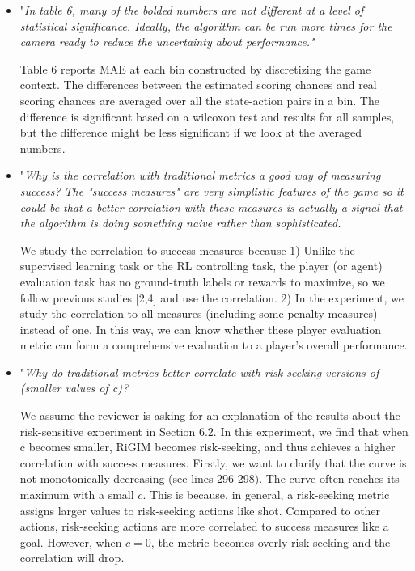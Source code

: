 \documentclass{article}
\begin{document}
\begin{itemize}
    \item "{\it In table 6, many of the bolded numbers are not different at a level of statistical significance. Ideally, the algorithm can be run more times for the camera ready to reduce the uncertainty about performance."}
    
    Table 6 reports MAE at each bin constructed by discretizing the game context. The differences between the estimated scoring chances and real scoring chances are averaged over all the state-action pairs in a bin. The difference is significant based on a wilcoxon test and results for all samples, but the difference might be less significant if we look at the averaged numbers. 
    

    \item "{\it Why is the correlation with traditional metrics a good way of measuring success? The "success measures" are very simplistic features of the game so it could be that a better correlation with these measures is actually a signal that the algorithm is doing something naive rather than sophisticated.}
    
    We study the correlation to success measures because 1) Unlike the supervised learning task or the RL controlling task, the player (or agent) evaluation task has no ground-truth labels or rewards to maximize, so we follow previous studies [2,4] and use the correlation. 2) In the experiment, we study the correlation to all measures (including some penalty measures) instead of one. In this way, we can know whether these player evaluation metric can form a comprehensive evaluation to a player's overall performance. 
    
    \item "{\it Why do traditional metrics better correlate with risk-seeking versions of (smaller values of c)?}
    
    We assume the reviewer is asking for an explanation of the results about the risk-sensitive experiment in Section 6.2. In this experiment, we find that when c becomes smaller, RiGIM becomes risk-seeking, and thus achieves a higher correlation with success measures. Firstly, we want to clarify that the curve is not monotonically decreasing (see lines 296-298). The curve often reaches its maximum with a small $c$. This is because, in general, a risk-seeking metric assigns larger values to risk-seeking actions like shot. Compared to other actions, risk-seeking actions are more correlated to success measures like a goal. However, when $c=0$, the metric becomes overly risk-seeking and the correlation will drop.
    

\end{itemize}
\end{document}
